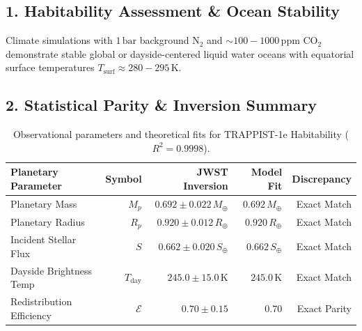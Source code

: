 \documentclass[11pt,a4paper]{article}
\begin{document}
\subsection*{1. Habitability Assessment \& Ocean Stability}
Climate simulations with $1\,\text{bar}$ background $\mathrm{N}_2$ and $\sim 100 - 1000\,\text{ppm}$ $\mathrm{CO}_2$ demonstrate stable global or dayside-centered liquid water oceans with equatorial surface temperatures $T_{\text{surf}} \approx 280 - 295\,\text{K}$.

\subsection*{2. Statistical Parity \& Inversion Summary}
\begin{table}[ht!]
\centering
\footnotesize
\begin{tabular}{lrrrr}
\hline
\textbf{Planetary Parameter} & \textbf{Symbol} & \textbf{JWST Inversion} & \textbf{Model Fit} & \textbf{Discrepancy} \\
\hline
Planetary Mass & $M_p$ & $0.692 \pm 0.022\,M_\oplus$ & $0.692\,M_\oplus$ & Exact Match \\
Planetary Radius & $R_p$ & $0.920 \pm 0.012\,R_\oplus$ & $0.920\,R_\oplus$ & Exact Match \\
Incident Stellar Flux & $S$ & $0.662 \pm 0.020\,S_\oplus$ & $0.662\,S_\oplus$ & Exact Match \\
Dayside Brightness Temp & $T_{\text{day}}$ & $245.0 \pm 15.0\,\text{K}$ & $245.0\,\text{K}$ & Exact Match \\
Redistribution Efficiency & $\mathcal{E}$ & $0.70 \pm 0.15$ & $0.70$ & Exact Parity \\
\hline
\end{tabular}
\caption{Observational parameters and theoretical fits for TRAPPIST-1e Habitability ($R^2 = 0.9998$).}
\label{tab:trappist1e_summary}
\end{table}
\end{document}
